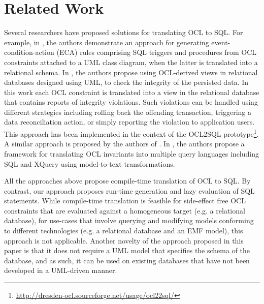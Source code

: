 \section{Related Work}
\label{sec:related}

Several researchers have proposed solutions for translating OCL to SQL. For example, in \cite{Berrabah2007}, the authors demonstrate an approach for generating event-condition-action (ECA) rules comprising SQL triggers and procedures from OCL constraints attached to a UML class diagram, when the latter is translated into a relational schema. In \cite{Demuth2001}, the authors propose using OCL-derived views in relational databases designed using UML, to check the integrity of the persisted data. In this work each OCL constraint is translated into a view in the relational database that contains reports of integrity violations. Such violations can be handled using different strategies including rolling back the offending transaction, triggering a data reconciliation action, or simply reporting the violation to application users. This approach has been implemented in the context of the OCL2SQL prototype\footnote{\url{http://dresden-ocl.sourceforge.net/usage/ocl22sql/}}. A similar approach is proposed by the authors of \cite{Marder2009}. In \cite{Heidenreich2007}, the authors propose a framework for translating OCL invariants into multiple query languages including SQL and XQuery using model-to-text transformations.

All the approaches above propose compile-time translation of OCL to SQL. By contrast, our approach proposes run-time generation and lazy evaluation of SQL statements. While compile-time translation is feasible for side-effect free OCL constraints that are evaluated against a homogeneous target (e.g. a relational database), for use-cases that involve querying and modifying models conforming to different technologies (e.g. a relational database and an EMF model), this approach is not applicable. Another novelty of the approach proposed in this paper is that it does not require a UML model that specifies the schema of the database, and as such, it can be used on existing databases that have not been developed in a UML-driven manner.